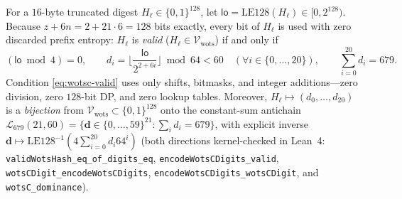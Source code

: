 \documentclass[11pt,a4paper]{article}
\theoremstyle{definition}
\theoremstyle{remark}
\newcommand{\bits}{\{0,1\}}
\newcommand{\calL}{\mathcal{L}}
\newcommand{\calV}{\mathcal{V}}
\begin{document}
For a $16$-byte truncated digest $H_\ell \in \bits^{128}$, let $\mathsf{lo} = \mathrm{LE128}(H_\ell) \in [0, 2^{128})$. Because $z + 6n = 2 + 21 \cdot 6 = 128$ bits exactly, every bit of $H_\ell$ is used with zero discarded prefix entropy: $H_\ell$ is \emph{valid} ($H_\ell \in \calV_{\mathrm{wots}}$) if and only if
\begin{equation}
\label{eq:wotsc-valid}
  (\mathsf{lo} \bmod 4) = 0,
  \qquad
  d_i = \Big\lfloor \frac{\mathsf{lo}}{2^{2 + 6i}} \Big\rfloor \bmod 64 < 60 \quad (\forall i \in \{0,\dots,20\}),
  \qquad
  \sum_{i=0}^{20} d_i = 679.
\end{equation}
Condition \eqref{eq:wotsc-valid} uses only shifts, bitmasks, and integer additions---zero division, zero $128$-bit DP, and zero lookup tables. Moreover, $H_\ell \mapsto (d_0, \dots, d_{20})$ is a \emph{bijection} from $\calV_{\mathrm{wots}} \subset \bits^{128}$ onto the constant-sum antichain $\calL_{679}(21, 60) = \{\mathbf{d} \in \{0,\dots,59\}^{21} : \sum_i d_i = 679\}$, with explicit inverse $\mathbf{d} \mapsto \mathrm{LE128}^{-1}(4 \sum_{i=0}^{20} d_i 64^i)$ (both directions kernel-checked in Lean~4: \texttt{validWotsHash\_\allowbreak eq\_\allowbreak of\_\allowbreak digits\_\allowbreak eq}, \texttt{encodeWotsCDigits\_\allowbreak valid}, \texttt{wotsCDigit\_\allowbreak encodeWotsCDigits}, \texttt{encodeWotsCDigits\_\allowbreak wotsCDigit}, and \texttt{wotsC\_\allowbreak dominance}).
\end{document}
